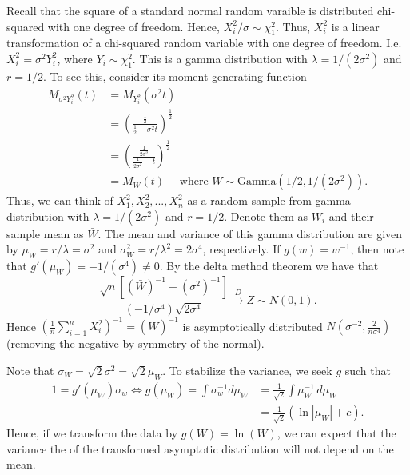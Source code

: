 \documentclass{stat_homework}
\begin{document}
\begin{solution}
Recall that the square of a standard normal random varaible is distributed chi-squared with one degree of freedom.  Hence, $X_i^2/\sigma \sim \chi^2_1$.  Thus, $X_i^2$ is a linear transformation of a chi-squared random variable with one degree of freedom.  I.e. $X_i^2 = \sigma^2 Y_i^2$, where $Y_i\sim \chi_1^2$.  This is a gamma distribution with $\lambda = 1/(2\sigma^2)$ and $r= 1/2$.  To see this, consider its moment generating function
\begin{align*}
  M_{\sigma^2 Y_i^2}(t) 
  & = M_{Y_i^2} (\sigma^2 t)  \\
  & = \left( \frac{ \frac 12 }{ \frac 12 - \sigma^2 t} \right)^{\frac 12} \\
  & = \left( \frac{ \frac 1{2\sigma^2} }{ \frac 1{2\sigma^2} - t} \right)^{\frac 12} \\
  & = M_W(t) \quad\text{ where }W \sim\text{Gamma}(1/2,1/(2\sigma^2)).
\end{align*}
Thus, we can think of $X_1^2,X_2^2,...,X_n^2$ as a random sample from gamma distribution with $\lambda = 1/(2\sigma^2)$ and $r=1/2$.  Denote them as $W_i$ and their sample mean as $\bar W$.  The mean and variance of this gamma distribution are given by $\mu_W = r/\lambda = \sigma^2$ and $\sigma_W^2= r/\lambda^2 = 2 \sigma^4$, respectively. If $g(w) = w^{-1}$, then note that $g'(\mu_W) = -1/(\sigma^4) \not= 0$.  By the delta method theorem we have that 
$$
  \frac{ \sqrt n \left[(\bar W)^{-1} - (\sigma^2)^{-1}\right]} { \left(-1/\sigma^4\right) \sqrt{2 \sigma^4} } \stackrel{D}{\longrightarrow} Z \sim N(0,1).
$$
Hence $\left(\frac 1n \sum_{i=1}^n X_i^2\right)^{-1} = (\bar W)^{-1}$ is asymptotically distributed $N(\sigma^{-2}, \frac 2{n\sigma^4})$ (removing the negative by symmetry of the normal).  
\end{solution}


\begin{solution}
Note that $\sigma_W = \sqrt 2 \sigma^2 = \sqrt 2 \mu_W$. To stabilize the variance, we seek $g$ such that 
\begin{align*}
  1 = g'(\mu_W) \sigma_w \iff g(\mu_W) = \int \sigma_w^{-1} d\mu_W 
  &= \frac 1{\sqrt 2}\int \mu_W^{-1}\,d\mu_W\\
  &= \frac 1{\sqrt 2}(\ln |\mu_W| + c).
\end{align*}
Hence, if we transform the data by $g(W) = \ln(W)$, we can expect that the variance the of the transformed asymptotic distribution will not depend on the mean. 
\end{solution}
\end{document}
